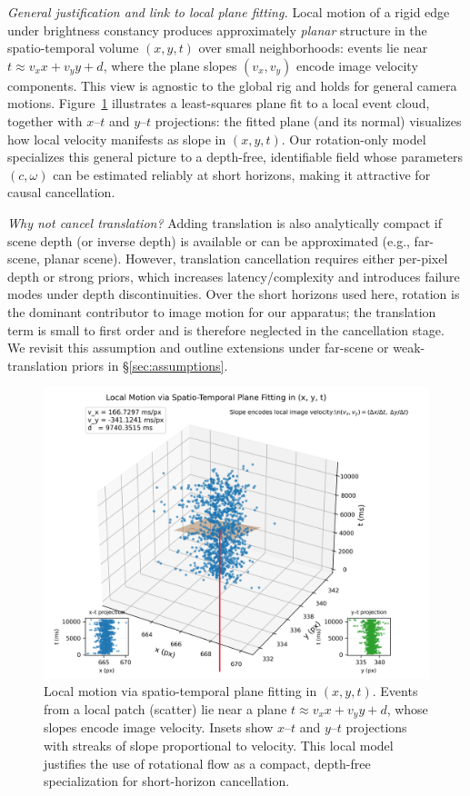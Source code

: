 \medskip\noindent\textit{General justification and link to local plane fitting.}
Local motion of a rigid edge under brightness constancy produces approximately \emph{planar} structure in the spatio-temporal volume $(x,y,t)$ over small neighborhoods: events lie near
\( t \approx v_x x + v_y y + d \), where the plane slopes $(v_x,v_y)$ encode image velocity components. This view is agnostic to the global rig and holds for general camera motions. Figure~\ref{fig:plane_fit_xyt} illustrates a least-squares plane fit to a local event cloud, together with $x$--$t$ and $y$--$t$ projections: the fitted plane (and its normal) visualizes how local velocity manifests as slope in $(x,y,t)$. Our rotation-only model specializes this general picture to a depth-free, identifiable field whose parameters $(c,\omega)$ can be estimated reliably at short horizons, making it attractive for causal cancellation.

\medskip\noindent\textit{Why not cancel translation?}
Adding translation is also analytically compact if scene depth (or inverse depth) is available or can be approximated (e.g., far-scene, planar scene). However, translation cancellation requires either per-pixel depth or strong priors, which increases latency/complexity and introduces failure modes under depth discontinuities. Over the short horizons used here, rotation is the dominant contributor to image motion for our apparatus; the translation term is small to first order and is therefore neglected in the cancellation stage. We revisit this assumption and outline extensions under far-scene or weak-translation priors in \S\ref{sec:assumptions}.

\begin{figure}[t]
  \centering
  \includegraphics[width=0.88\linewidth]{images/results_figures/plane_fit_xyt.png}
  \caption{Local motion via spatio-temporal plane fitting in $(x,y,t)$. Events from a local patch (scatter) lie near a plane \(t \approx v_x x + v_y y + d\), whose slopes encode image velocity. Insets show $x$--$t$ and $y$--$t$ projections with streaks of slope proportional to velocity. This local model justifies the use of rotational flow as a compact, depth-free specialization for short-horizon cancellation.}
  \label{fig:plane_fit_xyt}
\end{figure}

